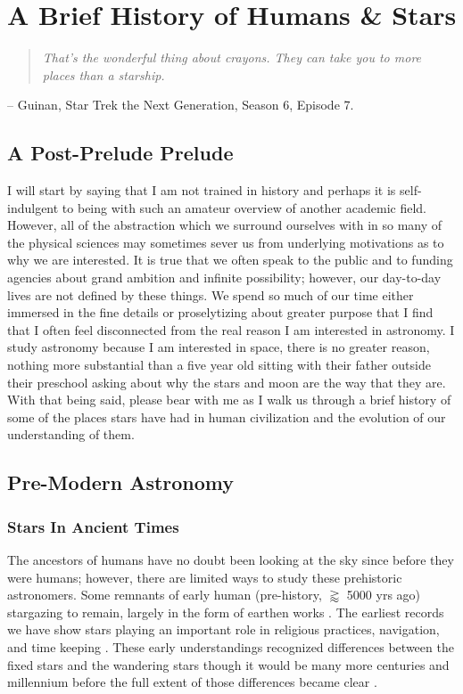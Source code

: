 \chapter{A Brief History of Humans \& Stars}
\begin{quote}\em
  That's the wonderful thing about crayons. They can take you to more places than a starship.
\end{quote}
\begin{flushright}
-- Guinan, Star Trek the Next Generation, Season 6, Episode 7.
\end{flushright}
\section{A Post-Prelude Prelude}
I will start by saying that I am not trained in history and perhaps it is
self-indulgent to being with such an amateur overview of another academic
field. However, all of the abstraction which we surround ourselves with in so
many of the physical sciences may sometimes sever us from underlying
motivations as to why we are interested. It is true that we often speak to the
public and to funding agencies about grand ambition and infinite possibility;
however, our day-to-day lives are not defined by these things. We spend so much
of our time either immersed in the fine details or proselytizing about greater
purpose that I find that I often feel disconnected from the real reason I am
interested in astronomy. I study astronomy because I am interested in space,
there is no greater reason, nothing more substantial than a five year old
sitting with their father outside their preschool asking about why the stars
and moon are the way that they are. With that being said, please bear with me
as I walk us through a brief history of some of the places stars have had in
human civilization and the evolution of our understanding of them.

\section{Pre-Modern Astronomy}
\subsection{Stars In Ancient Times}
The ancestors of humans have no doubt been looking at the sky since before they
were humans; however, there are limited ways to study these prehistoric
astronomers. Some remnants of early human (pre-history, $\gtrapprox$ 5000 yrs
ago) stargazing to remain, largely in the form of earthen works
\citep{Ouzounian1984, Benferfour2009}. The earliest records we have show stars
playing an important role in religious practices, navigation, and time keeping
\citep{Arnold1894, Evans1998, Kelley2005, Hannah2015}. These early understandings recognized differences between the fixed
stars and the wandering stars though it would be many more centuries and
millennium before the full extent of those differences became clear \citep{Kasak2001, Tarnas2009, Cullen2011, Leicht2011, Quack2019}.


